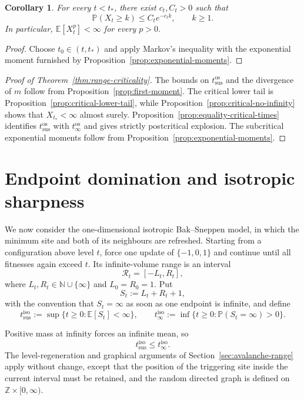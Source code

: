 \documentclass[11pt,a4paper]{amsart}
\newtheorem{corollary}[theorem]{Corollary}
\theoremstyle{remark}
\newcommand{\N}{\mathbb N}
\newcommand{\Z}{\mathbb Z}
\begin{document}
\begin{corollary}
\label{cor:subcritical-tails}
For every \(t<t_*\), there exist \(c_t,C_t>0\) such that
\[
        \mathbb{P}(X_t\geq k)\leq C_te^{-c_tk},
        \qquad k\geq1.
\]
In particular, \(\mathbb{E}[X_t^p]<\infty\) for every \(p>0\).
\end{corollary}

\begin{proof}
Choose \(t_0\in(t,t_*)\) and apply Markov's inequality with the exponential
moment furnished by Proposition~\ref{prop:exponential-moments}.
\end{proof}

\begin{proof}[Proof of Theorem~\ref{thm:range-criticality}]
The bounds on $t_{\mathrm{sus}}^{\mathrm{os}}$ and the divergence of
$m$ follow from Proposition~\ref{prop:first-moment}. The critical lower tail
is Proposition~\ref{prop:critical-lower-tail}, while
Proposition~\ref{prop:critical-no-infinity} shows that
$X_{t_*}<\infty$ almost surely. Proposition~\ref{prop:equality-critical-times}
identifies $t_{\mathrm{sus}}^{\mathrm{os}}$ with $t_{\infty}^{\mathrm{os}}$
and gives strictly postcritical explosion. The subcritical exponential
moments follow from Proposition~\ref{prop:exponential-moments}.
\end{proof}

\section{Endpoint domination and isotropic sharpness}
\label{sec:isotropic-range}

We now consider the one-dimensional isotropic Bak--Sneppen model, in which
the minimum site and both of its neighbours are refreshed. Starting from a
configuration above level $t$, force one update of $\{-1,0,1\}$ and continue
until all fitnesses again exceed $t$. Its infinite-volume range is an interval
\[
        \mathcal R_t=[-L_t,R_t],
\]
where $L_t,R_t\in\N\cup\{\infty\}$ and $L_0=R_0=1$. Put
\[
        S_t:=L_t+R_t+1,
\]
with the convention that $S_t=\infty$ as soon as one endpoint is infinite,
and define
\[
        t_{\mathrm{sus}}^{\mathrm{iso}}
        :=\sup\{t\geq0:\mathbb{E}[S_t]<\infty\},
        \qquad
        t_{\infty}^{\mathrm{iso}}
        :=\inf\{t\geq0:\mathbb{P}(S_t=\infty)>0\}.
\]

Positive mass at infinity forces an infinite mean, so
\begin{equation}
\label{eq:isotropic-easy-threshold-order}
        t_{\mathrm{sus}}^{\mathrm{iso}}
        \leq t_{\infty}^{\mathrm{iso}}.
\end{equation}
The level-regeneration and graphical arguments of
Section~\ref{sec:avalanche-range} apply without change, except that the
position of the triggering site inside the current interval must be retained, and the random directed graph is defined on $\Z \times [0,\infty)$.
\end{document}
